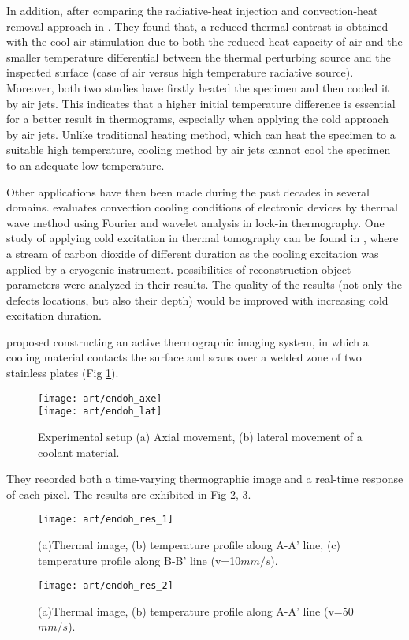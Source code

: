 In addition, after comparing  the radiative-heat injection and convection-heat removal approach in \citep{Maldague1993Nondestructive}. They found that, a reduced thermal contrast is obtained with the cool air stimulation due to both the reduced heat capacity of air and the smaller temperature differential between the thermal perturbing source and the inspected surface (case of air versus high temperature radiative source).  Moreover, both two studies have firstly heated the specimen and then cooled it by air jets. This indicates that a higher initial temperature difference is essential for a better result in thermograms, especially when applying the cold approach by air jets. Unlike traditional heating method, which can heat the specimen to a suitable high temperature, cooling method by air jets cannot cool the specimen to an adequate low temperature. 


Other applications have then been made during the past decades in several domains. \citep{Swiatczak2008Evaluation} evaluates convection cooling conditions of electronic devices by thermal wave method using Fourier and wavelet analysis in lock-in thermography. One study of applying cold excitation in thermal tomography can be found in \citep{Bajorek2010Analysis}, where a stream of carbon dioxide of different duration as the cooling excitation was applied by a cryogenic instrument. possibilities of reconstruction object parameters were analyzed in their results. The quality of the results (not only the defects locations, but also their depth) would be improved with increasing cold excitation duration.

\citep{endohdynamical2012} proposed constructing an active thermographic imaging system, in which a cooling material contacts the surface and scans over a welded zone of two stainless plates (Fig \ref{endoh_fig}).
\begin{figure}[!htbp]
	\centering
	\texttt{[image: art/endoh\_axe]}\\
	\texttt{[image: art/endoh\_lat]}
	\caption{ Experimental setup (a) Axial movement, (b) lateral movement of a coolant material.}
	\label{endoh_fig}
\end{figure}
They recorded both a time-varying thermographic image and a real-time response of each pixel. The results are exhibited in Fig \ref{endoh_res_1}, \ref{endoh_res_2}.
\begin{figure}[!htbp]
	\centering
	\texttt{[image: art/endoh\_res\_1]}
	\caption{(a)Thermal image, (b) temperature profile along A-A’ line, (c) temperature profile along B-B’ line (v=10$mm/s$).}
	\label{endoh_res_1}
\end{figure}
\begin{figure}[!htbp]
	\centering
	\texttt{[image: art/endoh\_res\_2]}
	\caption{(a)Thermal image, (b) temperature profile along A-A’ line (v=50$ mm/s$).}
	\label{endoh_res_2}
\end{figure}


